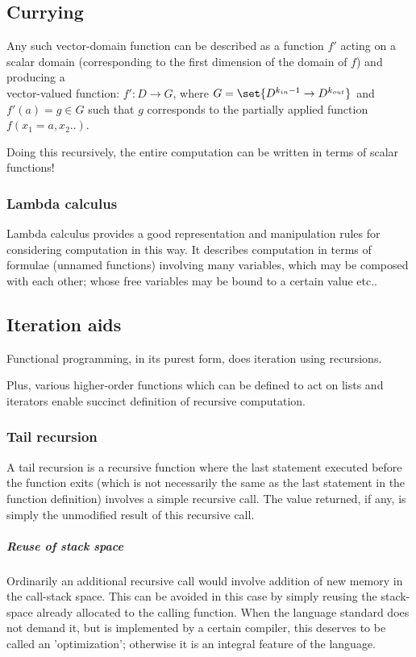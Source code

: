 \documentclass[oneside, article]{memoir}
\begin{document}
\subsection{Currying}
Any such vector-domain function can be described as a function $f'$ acting on a scalar domain (corresponding to the first dimension of the domain of $f$) and producing a \\
vector-valued function: $f':D \to G$, where $G = \set{D^{k_{in}-1} \to D^{k_{out}}}$ and $f'(a) = g \in G$ such that $g$ corresponds to the partially applied function $f(x_1 = a, x_2 .. )$.

Doing this recursively, the entire computation can be written in terms of scalar functions!

\subsubsection{Lambda calculus}
Lambda calculus provides a good representation and manipulation rules for considering computation in this way. It describes computation in terms of formulae (unnamed functions) involving many variables, which may be composed with each other; whose free variables may be bound to a certain value etc..


\subsection{Iteration aids}
Functional programming, in its purest form, does iteration using recursions.

Plus, various higher-order functions which can be defined to act on lists and iterators enable succinct definition of recursive computation.

\subsubsection{Tail recursion}
A tail recursion is a recursive function where the last statement executed before the function exits (which is not necessarily the same as the last statement in the function definition) involves a simple recursive call. The value returned, if any, is simply the unmodified result of this recursive call.

\subparagraph{Reuse of stack space}
Ordinarily an additional recursive call would involve addition of new memory in the call-stack space. This can be avoided in this case by simply reusing the stack-space already allocated to the calling function. When the language standard does not demand it, but is implemented by a certain compiler, this deserves to be called an 'optimization'; otherwise it is an integral feature of the language.
\end{document}
